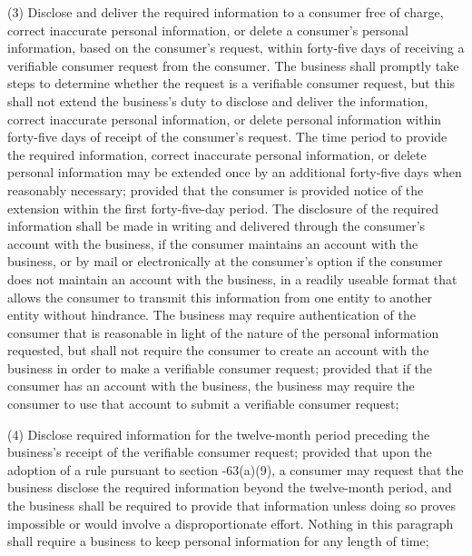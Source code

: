      (3)  Disclose and deliver the required information to a consumer free of charge, correct inaccurate personal information, or delete a consumer's personal information, based on the consumer's request, within forty-five days of receiving a verifiable consumer request from the consumer.  The business shall promptly take steps to determine whether the request is a verifiable consumer request, but this shall not extend the business's duty to disclose and deliver the information, correct inaccurate personal information, or delete personal information within forty-five days of receipt of the consumer's request.  The time period to provide the required information, correct inaccurate personal information, or delete personal information may be extended once by an additional forty-five days when reasonably necessary; provided that the consumer is provided notice of the extension within the first forty-five-day period.  The disclosure of the required information shall be made in writing and delivered through the consumer's account with the business, if the consumer maintains an account with the business, or by mail or electronically at the consumer's option if the consumer does not maintain an account with the business, in a readily useable format that allows the consumer to transmit this information from one entity to another entity without hindrance.  The business may require authentication of the consumer that is reasonable in light of the nature of the personal information requested, but shall not require the consumer to create an account with the business in order to make a verifiable consumer request; provided that if the consumer has an account with the business, the business may require the consumer to use that account to submit a verifiable consumer request;

     (4)  Disclose required information for the twelve-month period preceding the business's receipt of the verifiable consumer request; provided that upon the adoption of a rule pursuant to section    -63(a)(9), a consumer may request that the business disclose the required information beyond the twelve-month period, and the business shall be required to provide that information unless doing so proves impossible or would involve a disproportionate effort.  Nothing in this paragraph shall require a business to keep personal information for any length of time;

